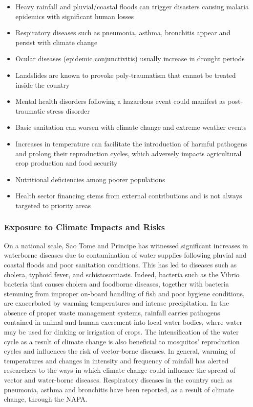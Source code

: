 \documentclass[
]{book}
\providecommand{\tightlist}{%
  \setlength{\itemsep}{0pt}\setlength{\parskip}{0pt}}
\begin{document}
\begin{itemize}
\tightlist
\item
  Heavy rainfall and pluvial/coastal floods can trigger disasters causing malaria epidemics with significant human losses
\item
  Respiratory diseases such as pneumonia, asthma, bronchitis appear and persist with climate change
\item
  Ocular diseases (epidemic conjunctivitis) usually increase in drought periods
\item
  Landslides are known to provoke poly-traumatism that cannot be treated inside the country
\item
  Mental health disorders following a hazardous event could manifest as post-traumatic stress disorder
\item
  Basic sanitation can worsen with climate change and extreme weather events
\item
  Increases in temperature can facilitate the introduction of harmful pathogens and prolong their reproduction cycles, which adversely impacts agricultural crop production and food security
\item
  Nutritional deficiencies among poorer populations
\item
  Health sector financing stems from external contributions and is not always targeted to priority areas
\end{itemize}

\hypertarget{exposure-to-climate-impacts-and-risks-17}{%
\subsubsection{Exposure to Climate Impacts and Risks}\label{exposure-to-climate-impacts-and-risks-17}}

On a national scale, Sao Tome and Principe has witnessed significant increases in waterborne diseases due to contamination of water supplies following pluvial and coastal floods and poor sanitation conditions. This has led to diseases such as cholera, typhoid fever, and schistosomiasis. Indeed, bacteria such as the Vibrio bacteria that causes cholera and foodborne diseases, together with bacteria stemming from improper on-board handling of fish and poor hygiene conditions, are exacerbated by warming temperatures and intense precipitation. In the absence of proper waste management systems, rainfall carries pathogens contained in animal and human excrement into local water bodies, where water may be used for dinking or irrigation of crops. The intensification of the water cycle as a result of climate change is also beneficial to mosquitos' reproduction cycles and influences the risk of vector-borne diseases. In general, warming of temperatures and changes in intensity and frequency of rainfall has alerted researchers to the ways in which climate change could influence the spread of vector and water-borne diseases. Respiratory diseases in the country such as pneumonia, asthma and bronchitis have been reported, as a result of climate change, through the NAPA.
\end{document}
